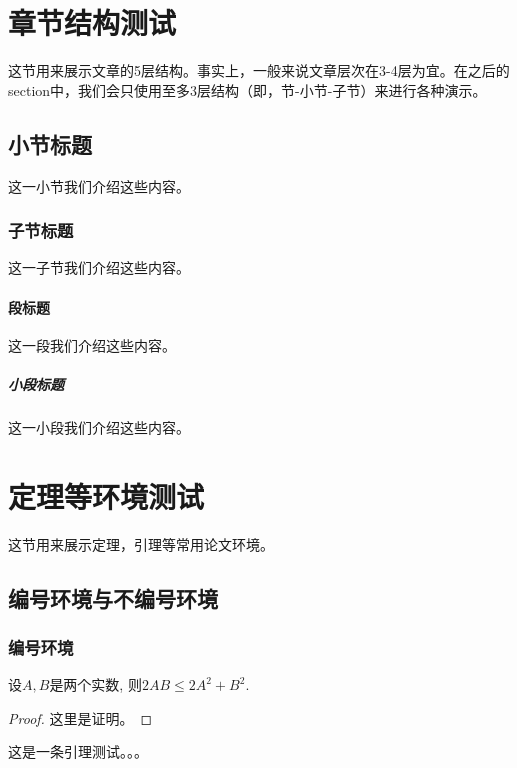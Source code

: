 \section{章节结构测试}这节用来展示文章的5层结构。事实上，一般来说文章层次在3-4层为宜。在之后的section中，我们会只使用至多3层结构（即，节-小节-子节）来进行各种演示。
 
\subsection{小节标题}这一小节我们介绍这些内容。

\subsubsection{子节标题}这一子节我们介绍这些内容。

\paragraph{段标题}这一段我们介绍这些内容。 

\subparagraph{小段标题}这一小段我们介绍这些内容。

\section{定理等环境测试}这节用来展示定理，引理等常用论文环境。
 
\subsection{编号环境与不编号环境}

\subsubsection{编号环境}

\begin{theorem}\label{thm2_1}

    设$A,B$是两个实数, 则$2AB\leq 2 A^2+B^2$.
    
\end{theorem}

\begin{proof}
    这里是证明。
\end{proof}

\begin{lemma}[Nakayama引理]\label{lem2_2}
    这是一条引理测试。。。
\end{lemma}

